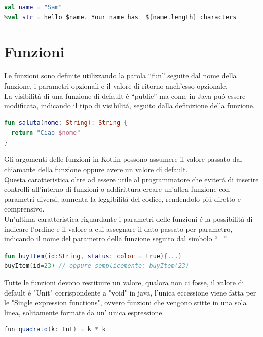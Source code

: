 \begin{lstlisting}[language=kotlin,caption={Esempio String template}]
val name = "Sam"
%val str = hello $name. Your name has  ${name.length} characters
\end{lstlisting}




\section{Funzioni}
Le funzioni sono definite utilizzando la parola ``fun'' seguite dal nome della funzione, i parametri opzionali e il valore di ritorno anch'esso opzionale.\\
La visibilit\'a di una funzione di default \'e ``public'' ma come in Java pu\'o essere modificata, indicando il tipo di visibilit\'a, seguito dalla definizione della funzione.

\begin{lstlisting}[language=Kotlin,caption={Esempio Funzione Kotlin}]
fun saluta(nome: String): String {
  return "Ciao $nome"
}
\end{lstlisting}

Gli argomenti delle funzioni in Kotlin possono assumere il valore passato dal chiamante della funzione oppure avere un valore di default.\\ Questa caratteristica oltre ad essere utile al programmatore che eviter\'a di inserire controlli all'interno di funzioni o addirittura creare un'altra funzione con parametri diversi, aumenta la leggibilit\'a del codice, rendendolo pi\'u diretto e comprensivo.\\
Un'ultima caratteristica riguardante i parametri delle funzioni \'e la possibilit\'a di indicare l'ordine e il valore a cui assegnare il dato passato per parametro, indicando il nome del parametro della funzione seguito dal simbolo ``=''

\begin{lstlisting}[language=kotlin,caption={Esempio Kotlin Parametri}]
fun buyItem(id:String, status: color = true){...}
buyItem(id=23) // oppure semplicemente: buyItem(23)
\end{lstlisting}

Tutte le funzioni devono restituire un valore, qualora non ci fosse, il valore di default \'e "Unit" corrispondente a "void" in java, l'unica eccessione viene fatta per le "Single expression functions", ovvero funzioni che vengono sritte in una sola linea, solitamente formate da un' unica espressione.
\begin{lstlisting}[language=java,caption={Esempio Single Exp. Function}]
fun quadrato(k: Int) = k * k
\end{lstlisting}

